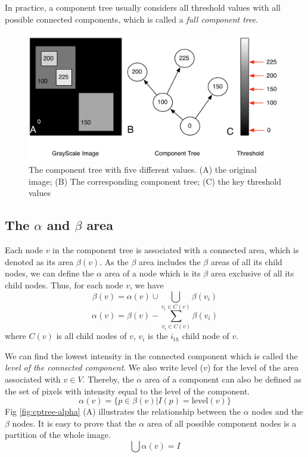 In practice, a component tree usually considers all threshold values with all possible connected components, which is called a \emph{full component tree}.

\begin{figure}[htbp]
\centering
\includegraphics[width=1.0\textwidth]{images/cptree_example}
\caption[An example of component tree with four levels and five components]{The component tree with five different values. (A) the original image; (B) The corresponding component tree; (C) the key threshold values}
\label{fig:cptree-example}
\end{figure}
\subsection{The $\alpha$ and $\beta$ area} \label{sec:alpha-beta-area}
Each node $v$ in the component tree is associated with a connected area, which is denoted as its area $\beta(v)$. As the $\beta$ area includes the $\beta$ areas of all its child nodes, we can define the $\alpha$ area of a node which is its $\beta$ area exclusive of all its child nodes. Thus, for each node $v$, we have
$$
\beta(v) = \alpha(v)\cup\bigcup_{v_i \in C(v)} \beta(v_i)   
$$
$$
\alpha(v) = \beta(v) - \sum_{v_i\in C(v)}\beta(v_i)
$$
where $C(v)$ is all child nodes of $v$, $v_i$ is the $i_{th}$ child node of $v$. 

We can find the lowest intensity in the connected component which is called the \emph{level of the connected component}. We also write level ($v$) for the level of the area associated with $v \in V$. Thereby, the $\alpha$ area of a component can also be defined as the set of pixels with intensity equal to the level of the component.
$$
\alpha(v) = \{p \in \beta(v)| I(p) = \mathrm{level}(v)\}
$$
Fig \ref{fig:cptree-alpha} (A) illustrates the relationship between the $\alpha$ nodes and the $\beta$ nodes. It is easy to prove that the $\alpha$ area of all possible component nodes is a partition of the whole image. 
$$
\bigcup \alpha(v) = I
$$

